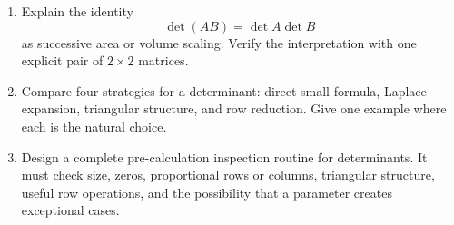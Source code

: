 \begin{enumerate}
\item Explain the identity
\[
\det(AB)=\det A\det B
\]
as successive area or volume scaling. Verify the interpretation with one explicit pair of $2\times2$ matrices.

\item Compare four strategies for a determinant: direct small formula, Laplace expansion, triangular structure, and row reduction. Give one example where each is the natural choice.

\item Design a complete pre-calculation inspection routine for determinants. It must check size, zeros, proportional rows or columns, triangular structure, useful row operations, and the possibility that a parameter creates exceptional cases.
\end{enumerate}
